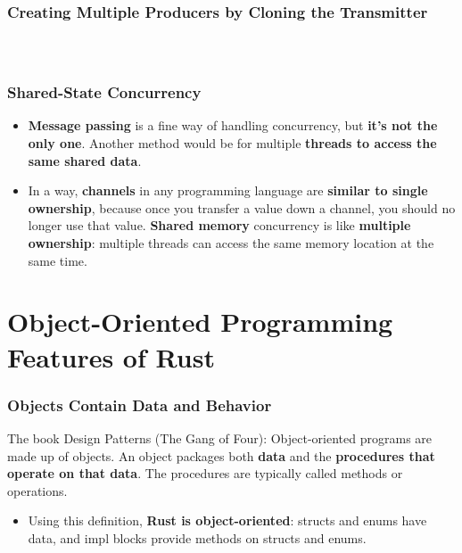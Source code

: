 \documentclass{beamer}
\begin{document}
\begin{frame}[fragile]
	\frametitle{Creating Multiple Producers by Cloning the Transmitter}
	
	
	\begin{columns}
		\inputminted{rust}{./code/thread7.rs}
		
		\inputminted[firstnumber=15]{rust}{./code/thread8.rs}
	\end{columns}
\end{frame}


\begin{frame}[fragile]
	\frametitle{Shared-State Concurrency}
	\begin{itemize}
		\item \textbf{Message passing} is a fine way of handling concurrency, but\textbf{ it’s not the only one}. Another method would be for multiple \textbf{threads to access the same shared data}.
		\item 	In a way, \textbf{channels} in any programming language are \textbf{similar to single ownership}, because once you transfer a value down a channel, you should no longer use that value. \textbf{Shared memory} concurrency is like \textbf{multiple ownership}: multiple threads can access the same memory location at the same time. 
	\end{itemize}
\end{frame}


\section{Object-Oriented Programming Features of Rust}

\begin{frame}[fragile]
	\frametitle{Objects Contain Data and Behavior}
	 \begin{block}{The book Design Patterns (The Gang of Four): }
		Object-oriented programs are made up of objects. An object packages both \textbf{data} and the \textbf{procedures that operate on that data}. The procedures are typically called methods or operations.
	\end{block}
	
	\begin{itemize}
		\item Using this definition, \textbf{Rust is object-oriented}: structs and enums have data, and impl blocks provide methods on structs and enums.
	\end{itemize}
\end{frame}
\end{document}
